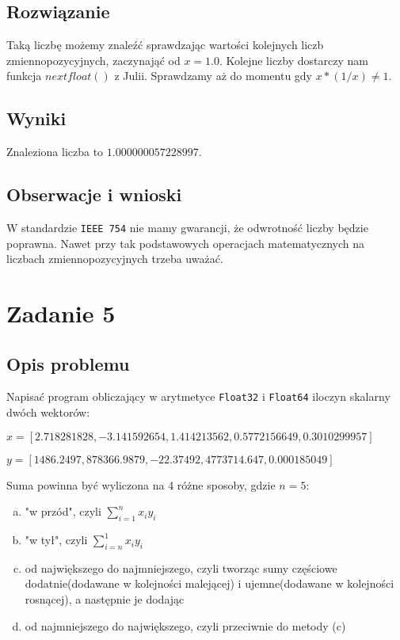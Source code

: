 \documentclass{article}
\begin{document}
\subsection{Rozwiązanie}
Taką liczbę możemy znaleźć sprawdzając wartości kolejnych liczb zmiennopozycyjnych, zaczynająć od $x = 1.0$. Kolejne
liczby dostarczy nam funkcja $nextfloat()$ z Julii. Sprawdzamy aż do momentu gdy $x * (1/x) \neq 1$.

\subsection{Wyniki}
Znaleziona liczba to $1.000000057228997$.

\subsection{Obserwacje i wnioski}
W standardzie \texttt{IEEE 754} nie mamy gwarancji, że odwrotność liczby będzie poprawna. Nawet przy tak podstawowych
operacjach matematycznych na liczbach zmiennopozycyjnych trzeba uważać.

\section{Zadanie 5}
\subsection{Opis problemu}
Napisać program obliczający w arytmetyce \texttt{Float32} i \texttt{Float64} iloczyn skalarny dwóch wektorów:
\begin{description}
    \item $x = [2.718281828, -3.141592654, 1.414213562, 0.5772156649, 0.3010299957]$
    \item $y = [1486.2497, 878366.9879, -22.37492, 4773714.647, 0.000185049]$
\end{description}
Suma powinna być wyliczona na 4 różne sposoby, gdzie $n=5$:
\begin{enumerate}[(a)]
    \item "w przód", czyli $\sum_{i=1}^n x_i y_i$
    \item "w tył", czyli $\sum_{i=n}^1 x_i y_i$
    \item od największego do najmniejszego, czyli tworząc sumy częściowe dodatnie(dodawane w kolejności malejącej) i
    ujemne(dodawane w kolejności rosnącej), a następnie je dodając
    \item od najmniejszego do największego, czyli przeciwnie do metody (c)
\end{enumerate}
\end{document}
